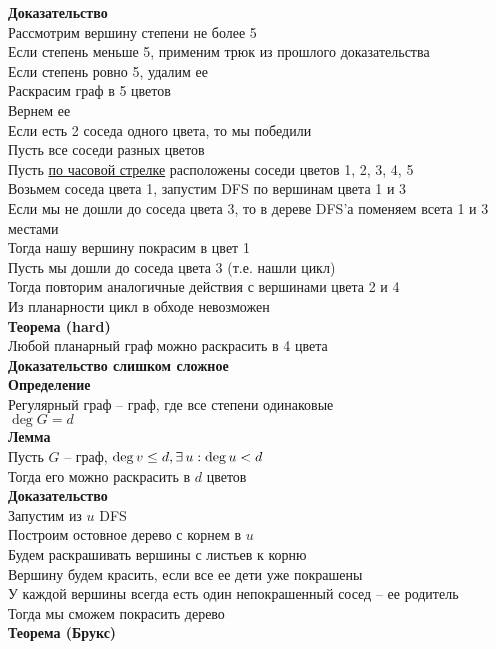 \documentclass[12pt]{article}
\begin{document}
\textbf{Доказательство}\\
Рассмотрим вершину степени не более 5\\
Если степень меньше 5, применим трюк из прошлого доказательства\\
Если степень ровно 5, удалим ее\\
Раскрасим граф в 5 цветов\\
Вернем ее\\
Если есть 2 соседа одного цвета, то мы победили\\
Пусть все соседи разных цветов\\
Пусть \underline{по часовой стрелке} расположены соседи цветов 1, 2, 3, 4, 5\\
Возьмем соседа цвета 1, запустим DFS по вершинам цвета 1 и 3\\
Если мы не дошли до соседа цвета 3, то в дереве DFS'а поменяем всета 1 и 3 местами\\
Тогда нашу вершину покрасим в цвет 1\\
Пусть мы дошли до соседа цвета 3 (т.е. нашли цикл)\\
Тогда повторим аналогичные действия с вершинами цвета 2 и 4\\
Из планарности цикл в обходе невозможен\\
\textbf{Теорема (hard)}\\
Любой планарный граф можно раскрасить в 4 цвета\\
\textbf{Доказательство слишком сложное}\\
\textbf{Определение}\\
Регулярный граф -- граф, где все степени одинаковые\\
$\deg G = d$\\
\textbf{Лемма}\\
Пусть $G$ -- граф, $\deg v \leq d, \exists\, u: \deg u < d$\\
Тогда его можно раскрасить в $d$ цветов\\
\textbf{Доказательство}\\
Запустим из $u$ DFS\\
Построим остовное дерево с корнем в $u$\\
Будем раскрашивать вершины с листьев к корню\\
Вершину будем красить, если все ее дети уже покрашены\\
У каждой вершины всегда есть один непокрашенный сосед -- ее родитель\\
Тогда мы сможем покрасить дерево\\
\textbf{Теорема (Брукс)}\\
\end{document}
